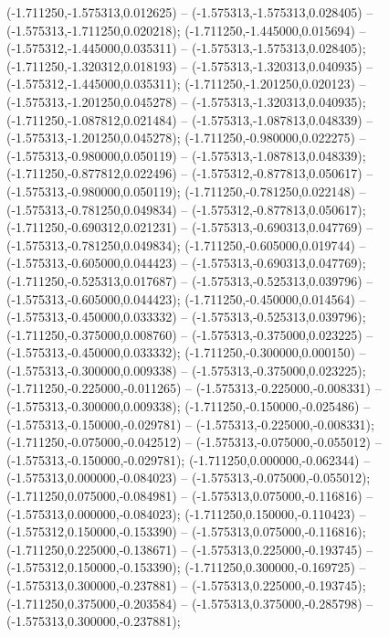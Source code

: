  (-1.711250,-1.575313,0.012625) -- (-1.575313,-1.575313,0.028405) -- (-1.575313,-1.711250,0.020218);
 (-1.711250,-1.445000,0.015694) -- (-1.575312,-1.445000,0.035311) -- (-1.575313,-1.575313,0.028405);
 (-1.711250,-1.320312,0.018193) -- (-1.575313,-1.320313,0.040935) -- (-1.575312,-1.445000,0.035311);
 (-1.711250,-1.201250,0.020123) -- (-1.575313,-1.201250,0.045278) -- (-1.575313,-1.320313,0.040935);
 (-1.711250,-1.087812,0.021484) -- (-1.575313,-1.087813,0.048339) -- (-1.575313,-1.201250,0.045278);
 (-1.711250,-0.980000,0.022275) -- (-1.575313,-0.980000,0.050119) -- (-1.575313,-1.087813,0.048339);
 (-1.711250,-0.877812,0.022496) -- (-1.575312,-0.877813,0.050617) -- (-1.575313,-0.980000,0.050119);
 (-1.711250,-0.781250,0.022148) -- (-1.575313,-0.781250,0.049834) -- (-1.575312,-0.877813,0.050617);
 (-1.711250,-0.690312,0.021231) -- (-1.575313,-0.690313,0.047769) -- (-1.575313,-0.781250,0.049834);
 (-1.711250,-0.605000,0.019744) -- (-1.575313,-0.605000,0.044423) -- (-1.575313,-0.690313,0.047769);
 (-1.711250,-0.525313,0.017687) -- (-1.575313,-0.525313,0.039796) -- (-1.575313,-0.605000,0.044423);
 (-1.711250,-0.450000,0.014564) -- (-1.575313,-0.450000,0.033332) -- (-1.575313,-0.525313,0.039796);
 (-1.711250,-0.375000,0.008760) -- (-1.575313,-0.375000,0.023225) -- (-1.575313,-0.450000,0.033332);
 (-1.711250,-0.300000,0.000150) -- (-1.575313,-0.300000,0.009338) -- (-1.575313,-0.375000,0.023225);
 (-1.711250,-0.225000,-0.011265) -- (-1.575313,-0.225000,-0.008331) -- (-1.575313,-0.300000,0.009338);
 (-1.711250,-0.150000,-0.025486) -- (-1.575313,-0.150000,-0.029781) -- (-1.575313,-0.225000,-0.008331);
 (-1.711250,-0.075000,-0.042512) -- (-1.575313,-0.075000,-0.055012) -- (-1.575313,-0.150000,-0.029781);
 (-1.711250,0.000000,-0.062344) -- (-1.575313,0.000000,-0.084023) -- (-1.575313,-0.075000,-0.055012);
 (-1.711250,0.075000,-0.084981) -- (-1.575313,0.075000,-0.116816) -- (-1.575313,0.000000,-0.084023);
 (-1.711250,0.150000,-0.110423) -- (-1.575312,0.150000,-0.153390) -- (-1.575313,0.075000,-0.116816);
 (-1.711250,0.225000,-0.138671) -- (-1.575313,0.225000,-0.193745) -- (-1.575312,0.150000,-0.153390);
 (-1.711250,0.300000,-0.169725) -- (-1.575313,0.300000,-0.237881) -- (-1.575313,0.225000,-0.193745);
 (-1.711250,0.375000,-0.203584) -- (-1.575313,0.375000,-0.285798) -- (-1.575313,0.300000,-0.237881);
